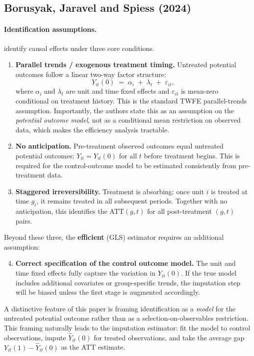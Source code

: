\documentclass[12pt]{article}
\begin{document}
\subsection{Borusyak, Jaravel and Spiess (2024)}

\paragraph{Identification assumptions.}
\citet{borusyak2024revisiting} identify causal effects under three core
conditions.
\begin{enumerate}
  \item \textbf{Parallel trends / exogenous treatment timing.}
        Untreated potential outcomes follow a linear two-way factor structure:
        \[
          Y_{it}(0) \;=\; \alpha_i \;+\; \lambda_t \;+\; \varepsilon_{it},
        \]
        where $\alpha_i$ and $\lambda_t$ are unit and time fixed effects and
        $\varepsilon_{it}$ is mean-zero conditional on treatment history.
        This is the standard TWFE parallel-trends assumption.
        Importantly, the authors state this as an assumption on the
        \textit{potential outcome model}, not as a conditional mean
        restriction on observed data, which makes the efficiency analysis
        tractable.

  \item \textbf{No anticipation.}
        Pre-treatment observed outcomes equal untreated potential outcomes:
        $Y_{it} = Y_{it}(0)$ for all $t$ before treatment begins.
        This is required for the control-outcome model to be estimated
        consistently from pre-treatment data.

  \item \textbf{Staggered irreversibility.}
        Treatment is absorbing: once unit $i$ is treated at time $g_i$,
        it remains treated in all subsequent periods.
        Together with no anticipation, this identifies the ATT$(g, t)$
        for all post-treatment $(g, t)$ pairs.
\end{enumerate}
Beyond these three, the \textbf{efficient} (GLS) estimator requires an
additional assumption:
\begin{enumerate}
  \setcounter{enumi}{3}
  \item \textbf{Correct specification of the control outcome model.}
        The unit and time fixed effects fully capture the variation in
        $Y_{it}(0)$.
        If the true model includes additional covariates or group-specific
        trends, the imputation step will be biased unless the first stage
        is augmented accordingly.
\end{enumerate}
A distinctive feature of this paper is framing identification as a
\textit{model} for the untreated potential outcome rather than as a
selection-on-observables restriction.
This framing naturally leads to the imputation estimator: fit the model to
control observations, impute $\hat{Y}_{it}(0)$ for treated observations,
and take the average gap $Y_{it}(1) - \hat{Y}_{it}(0)$ as the ATT estimate.
\end{document}
